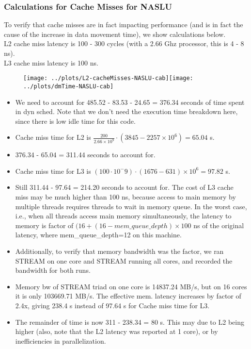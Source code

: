 \begin{frame}
\frametitle{Calculations for Cache Misses for NASLU} 
{\small To verify that cache misses are in fact impacting performance 
(and is in fact the cause of the increase in data movement time), we show calculations below. }\\
{\tiny L2 cache miss latency is 100 - 300 cycles (with a 2.66 Ghz processor, this is 4 - 8 ns). }\\
{\tiny L3 cache miss latency is 100 ns. }\\
\begin{figure}[ht]
\label{fig:cacheMisses-cab-forCalcs}
\begin{center}
\texttt{[image: ../plots/L2-cacheMisses-NASLU-cab]}\texttt{[image: ../plots/dmTime-NASLU-cab]}
\end{center}
\end{figure} 

\begin{itemize}
\tiny \item \tiny We need to account for 485.52 - 83.53 - 24.65 = 
376.34 seconds of time spent in dyn sched. Note that we don't need the
execution time breakdown here, since there is low idle time for this code. 
\item \tiny Cache miss time for L2 is $\frac{200}{2.66 \times 10^9}
  \cdot (3845- 2257 \times 10^6) = 65.04$ s. 
\item \tiny 376.34 - 65.04 = 311.44 seconds to account for.
\item \tiny Cache miss time for L3 is $(100 \cdot 10^-9) \cdot (1676
  - 631) \times 10^6 =  97.82 $ s. 
\item \tiny Still 311.44 - 97.64 = 214.20 seconds to account for. 
  The cost of L3 cache miss may be much higher than 100 ns,
  because access to main memory by multiple threads requires threads to wait in memory
  queue. In the worst case, i.e., when all threads access main memory simultaneously, 
  the latency to memory is factor of $(16+(16-mem\_queue\_depth)\times
  100$ ns of the original latency, where mem\_queue\_depth=12 on this
  machine. 
\item \tiny Additionally, to verify that memory bandwidth was the
  factor, we ran STREAM on one core and STREAM running all cores, and
  recorded the bandwidth for both runs. 
\item \tiny Memory bw of STREAM triad on one core is 14837.24 MB/s, but on 16
  cores it is only 103669.71 MB/s. The effective mem. latency
  increases by factor of 2.4x, giving 238.4 s instead of 97.64 s for
  Cache miss time for L3. 
\item \tiny The remainder of time is now 311 - 238.34 = 80 s. This may
  due to L2 being higher (also, note that the L2 latency was reported at
  1 core), or by inefficiencies in parallelization. 
\end{itemize} 
\end{frame}

